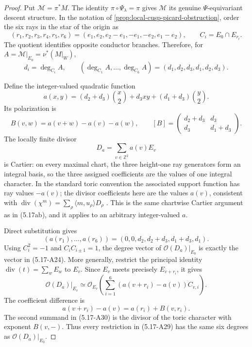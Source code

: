 \begin{proof}
Put \(\mathcal M=\pi^*M\).  The identity
\(\pi\circ\Psi_\lambda=\pi\) gives \(\mathcal M\) its genuine
\(\Psi\)-equivariant descent structure.  In the notation of
\cref{prop:local-cusp-picard-obstruction}, order the six rays in the star
of the origin as
\[
 (r_1,r_2,r_3,r_4,r_5,r_6)
 =(e_1,e_2,e_2-e_1,-e_1,-e_2,e_1-e_2),
 \qquad C_i=E_0\cap E_{r_i}.
\tag{5.17-A23}
\]
The quotient identifies opposite conductor branches.  Therefore, for
\(A=\mathcal M|_{E_0}=\nu^*(M|_W)\),
\[
 d_i=\deg_{C_i}A,
 \qquad
 (\deg_{C_1}A,\ldots,\deg_{C_6}A)
 =(d_1,d_2,d_3,d_1,d_2,d_3).
\tag{5.17-A24}
\]

Define the integer-valued quadratic function
\[
 a(x,y)
 =(d_2+d_3)\binom{x}{2}+d_3xy+(d_1+d_3)\binom{y}{2}.
\tag{5.17-A25}
\]
Its polarization is
\[
 B(v,w)=a(v+w)-a(v)-a(w),
 \qquad
 [B]=
 \begin{pmatrix}
  d_2+d_3&d_3\\ d_3&d_1+d_3
 \end{pmatrix}.
\tag{5.17-A26}
\]
The locally finite divisor
\[
 D_a=\sum_{v\in\mathbb Z^2}a(v)E_v
\tag{5.17-A27}
\]
is Cartier: on every maximal chart, the three height-one ray generators
form an integral basis, so the three assigned coefficients are the values
of one integral character.  In the standard toric convention the associated
support function has ray values \(-a(v)\); the divisor coefficients here are
the values \(a(v)\), consistent with
\(\operatorname{div}(\chi^m)=\sum_\rho\langle m,u_\rho\rangle D_\rho\)
\cite[\S3.3, pp.~60--63; \S3.4, pp.~63--72]{Fulton1993}%
\cite[Propositions~4.1.1--4.1.2, p.~171; Theorems~4.2.8,
p.~179 and~4.2.12, p.~182]{CoxLittleSchenck2011}.
This is the same chartwise Cartier argument as
in (5.17ab), and it applies to an arbitrary integer-valued \(a\).

Direct substitution gives
\[
 (a(r_1),\ldots,a(r_6))
 =(0,0,d_2,d_2+d_3,d_1+d_3,d_1).
\tag{5.17-A28}
\]
Using \(C_i^2=-1\) and \(C_iC_{i\pm1}=1\), the degree vector of
\(\mathcal O(D_a)|_{E_0}\) is exactly the vector in (5.17-A24).  More
generally, restrict the principal identity
\(\operatorname{div}(t)=\sum_wE_w\) to \(E_v\).  Since \(E_v\) meets
precisely \(E_{v+r_i}\), it gives
\[
 \mathcal O(D_a)|_{E_v}
 \simeq
 \mathcal O_{E_v}\!\left(
   \sum_{i=1}^6(a(v+r_i)-a(v))C_{v,i}
 \right).
\tag{5.17-A29}
\]
The coefficient difference is
\[
 a(v+r_i)-a(v)=a(r_i)+B(v,r_i).
\tag{5.17-A30}
\]
The second summand in (5.17-A30) is the divisor of the toric character
with exponent \(B(v,-)\).  Thus every restriction in (5.17-A29) has the
same six degrees as \(\mathcal O(D_a)|_{E_0}\).


\end{proof}
